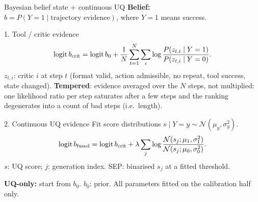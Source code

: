 \documentclass[10pt, aspectratio=43]{beamer}
\begin{document}
\begin{frame}{Bayesian belief state + continuous UQ}
\small
\textbf{Belief:} $b=P(Y=1\mid\text{trajectory evidence})$, where $Y=1$ means success.

\begin{block}{1. Tool / critic evidence}
\vspace{-0.3em}
\[
 \operatorname{logit}b_{\rm crit}
 =\operatorname{logit}b_0+
 \frac{1}{N}\sum_{t=1}^{N}\sum_i\log\frac{P(z_{t,i}\mid Y=1)}{P(z_{t,i}\mid Y=0)}.
\]
\vspace{-0.6em}
\footnotesize
$z_{t,i}$: critic $i$ at step $t$ (format valid, action admissible, no repeat,
tool success, state changed). \textbf{Tempered}: evidence averaged over the $N$ steps,
not multiplied: one likelihood ratio per step saturates after a few steps and the
ranking degenerates into a count of bad steps (i.e.\ length).
\par\vspace{0.2em}
\end{block}

\begin{block}{2. Continuous UQ evidence}
\small
Fit score distributions $s\mid Y=y\sim\mathcal N(\mu_y,\sigma_y^2)$.
\vspace{-0.3em}
\[
 \operatorname{logit}b_{\rm fused}
 =\operatorname{logit}b_{\rm crit}
 +\lambda\sum_j\log
 \frac{\mathcal N(s_j;\mu_1,\sigma_1^2)}
      {\mathcal N(s_j;\mu_0,\sigma_0^2)}.
\]
\vspace{-0.6em}
\footnotesize
$s$: UQ score; $j$: generation index. SEP: binarised $s_j$ at a fitted threshold.
\par\vspace{0.2em}
\end{block}

\footnotesize
\textbf{UQ-only:} start from $b_0$.\quad
$b_0$: prior. All parameters fitted on the calibration half only.
\end{frame}
\end{document}
